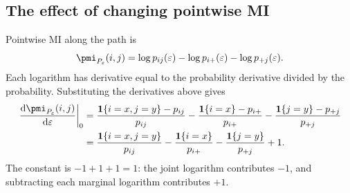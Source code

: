 \subsection{The effect of changing pointwise MI}

Pointwise MI along the path is
\begin{equation*}
  \pmi_{P_\varepsilon}(i,j)
  =\log p_{ij}(\varepsilon)
   -\log p_{i+}(\varepsilon)
   -\log p_{+j}(\varepsilon).
\end{equation*}
Each logarithm has derivative equal to the probability derivative
divided by the probability. Substituting the derivatives above gives
\begin{align}
  \left.\frac{\mathrm d\pmi_{P_\varepsilon}(i,j)}
                   {\mathrm d\varepsilon}\right|_0
  &={\frac{\mathbf 1\{i=x,j=y\}-p_{ij}}{p_{ij}}}
    -\frac{\mathbf 1\{i=x\}-p_{i+}}{p_{i+}}
    -\frac{\mathbf 1\{j=y\}-p_{+j}}{p_{+j}}\notag\\
  &=\frac{\mathbf 1\{i=x,j=y\}}{p_{ij}}
    -\frac{\mathbf 1\{i=x\}}{p_{i+}}
    -\frac{\mathbf 1\{j=y\}}{p_{+j}}+1.
  \label{eq:pmi-derivative}
\end{align}
The constant is \(-1+1+1=1\): the joint logarithm contributes
\(-1\), and subtracting each marginal logarithm contributes \(+1\).

